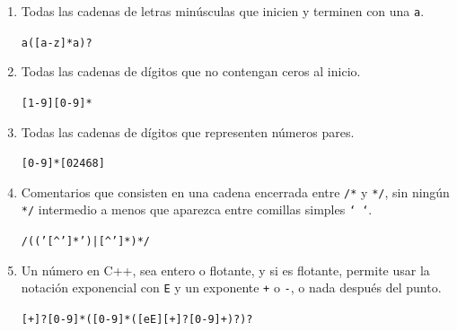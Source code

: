 \documentclass[a4paper, twoside, 12pt]{article}
\begin{document}
\begin{enumerate}
    \item Todas las cadenas de letras minúsculas que inicien y terminen con una \texttt{a}.

    \texttt{a([a-z]*a)?}
    
    \item Todas las cadenas de dígitos que no contengan ceros al inicio.

    \texttt{[1-9][0-9]*}
    
    \item Todas las cadenas de dígitos que representen números pares.

    \texttt{[0-9]*[02468]}
    
    \item Comentarios que consisten en una cadena encerrada entre \texttt{/*} y \texttt{*/}, sin ningún \texttt{*/} intermedio a menos que aparezca entre comillas simples \texttt{‘ ‘}.

    \texttt{{/\color{magenta}{\textbackslash*}}(('[\textasciicircum']*')|[\textasciicircum']*)*{\color{magenta}{\textbackslash*}}/}
    
    \item Un número en C++, sea entero o flotante, y si es flotante, permite usar la notación exponencial con \texttt{E} y un exponente \texttt{+} o \texttt{-}, o nada después del punto.

    \texttt{[+{\color{magenta}{\textbackslash-}}]?[0-9]*({\color{magenta}{\textbackslash.}}[0-9]*([eE][+{\color{magenta}{\textbackslash-}}]?[0-9]+)?)?}
\end{enumerate}
\end{document}
